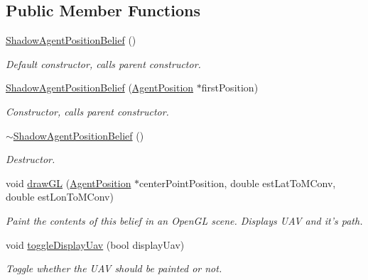 \subsection*{Public Member Functions}
\begin{DoxyCompactItemize}
\item 
\hypertarget{class_shadow_agent_position_belief_a8eeff68213aa4ee88e9105ae7ca9e482}{
\hyperlink{class_shadow_agent_position_belief_a8eeff68213aa4ee88e9105ae7ca9e482}{ShadowAgentPositionBelief} ()}
\label{class_shadow_agent_position_belief_a8eeff68213aa4ee88e9105ae7ca9e482}

\begin{DoxyCompactList}\small\item\em Default constructor, calls parent constructor. \end{DoxyCompactList}\item 
\hyperlink{class_shadow_agent_position_belief_a77ca6ed82e3015b6c7ffcfeab40d048c}{ShadowAgentPositionBelief} (\hyperlink{class_agent_position}{AgentPosition} $\ast$firstPosition)
\begin{DoxyCompactList}\small\item\em Constructor, calls parent constructor. \end{DoxyCompactList}\item 
\hypertarget{class_shadow_agent_position_belief_a2f1dc1eff278e3fa5483bd472dc98bb4}{
\hyperlink{class_shadow_agent_position_belief_a2f1dc1eff278e3fa5483bd472dc98bb4}{$\sim$ShadowAgentPositionBelief} ()}
\label{class_shadow_agent_position_belief_a2f1dc1eff278e3fa5483bd472dc98bb4}

\begin{DoxyCompactList}\small\item\em Destructor. \end{DoxyCompactList}\item 
void \hyperlink{class_shadow_agent_position_belief_a93612c99d78d18a09a50816ddd86e715}{drawGL} (\hyperlink{class_agent_position}{AgentPosition} $\ast$centerPointPosition, double estLatToMConv, double estLonToMConv)
\begin{DoxyCompactList}\small\item\em Paint the contents of this belief in an OpenGL scene. Displays UAV and it's path. \end{DoxyCompactList}\item 
void \hyperlink{class_shadow_agent_position_belief_a0418db9564b8c9a09a00796894ac079d}{toggleDisplayUav} (bool displayUav)
\begin{DoxyCompactList}\small\item\em Toggle whether the UAV should be painted or not. \end{DoxyCompactList}\end{DoxyCompactItemize}

